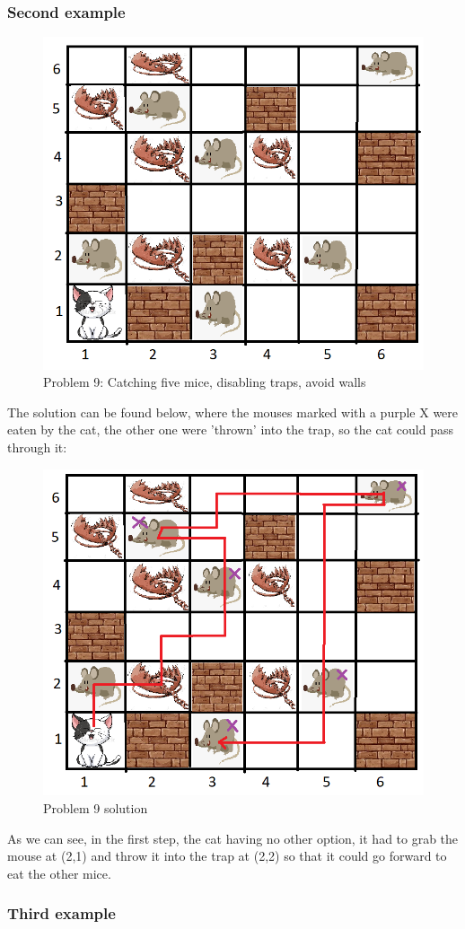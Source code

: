 \subsubsection{Second example}

\begin{figure}[ht]
    \centering
    \includegraphics[width=.5\linewidth]{fig/A3/cat_09.png}
    \caption{Problem 9: Catching five mice, disabling traps, avoid walls }
    \label{fig:cat_09}
\end{figure}



The solution can be found below, where the mouses marked with a purple X were eaten by the cat, the other one were 'thrown' into the trap, so the cat could pass through it:



\begin{figure}[ht]
    \centering
    \includegraphics[width=.5\linewidth]{fig/A3/cat_09_sol.png}
    \caption{Problem 9 solution}
    \label{fig:cat_09_sol}
\end{figure}


As we can see, in the first step, the cat having no other option, it had to grab the mouse at (2,1) and throw it into the trap at (2,2) so that it could go forward to eat the other mice.



\subsubsection{Third example}

